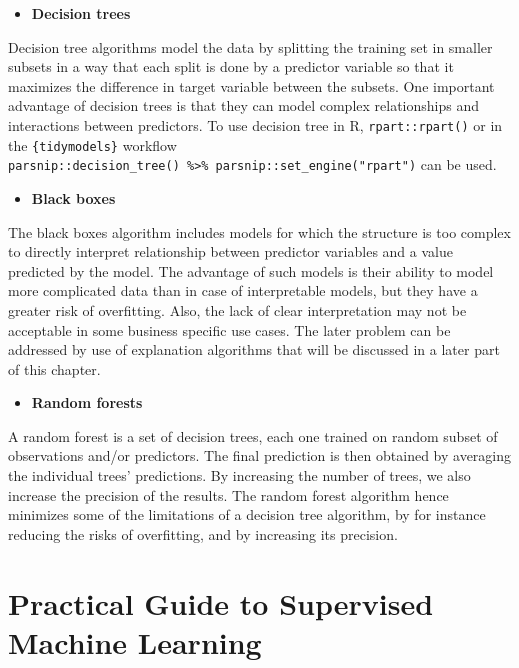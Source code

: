 \documentclass[
]{krantz}
\providecommand{\tightlist}{%
  \setlength{\itemsep}{0pt}\setlength{\parskip}{0pt}}
\begin{document}
\begin{itemize}
\tightlist
\item
  \textbf{Decision trees}
\end{itemize}

Decision tree algorithms model the data by splitting the training set in smaller subsets in a way that each split is done by a predictor variable so that it maximizes the difference in target variable between the subsets. One important advantage of decision trees is that they can model complex relationships and interactions between predictors. To use decision tree in R, \texttt{rpart::rpart()} or in the \texttt{\{tidymodels\}} workflow \texttt{parsnip::decision\_tree()\ \%\textgreater{}\%\ parsnip::set\_engine("rpart")} can be used.

\begin{itemize}
\tightlist
\item
  \textbf{Black boxes}
\end{itemize}

The black boxes algorithm includes models for which the structure is too complex to directly interpret relationship between predictor variables and a value predicted by the model. The advantage of such models is their ability to model more complicated data than in case of interpretable models, but they have a greater risk of overfitting. Also, the lack of clear interpretation may not be acceptable in some business specific use cases. The later problem can be addressed by use of explanation algorithms that will be discussed in a later part of this chapter.

\begin{itemize}
\tightlist
\item
  \textbf{Random forests}
\end{itemize}

A random forest is a set of decision trees, each one trained on random subset of observations and/or predictors. The final prediction is then obtained by averaging the individual trees' predictions. By increasing the number of trees, we also increase the precision of the results. The random forest algorithm hence minimizes some of the limitations of a decision tree algorithm, by for instance reducing the risks of overfitting, and by increasing its precision.

\hypertarget{practical-guide-to-supervised-machine-learning}{%
\section{Practical Guide to Supervised Machine Learning}\label{practical-guide-to-supervised-machine-learning}}
\end{document}
